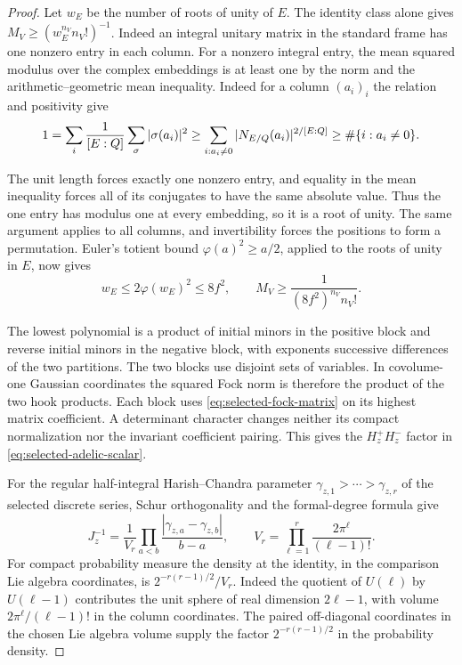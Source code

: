 \begin{proof}
Let \(w_E\) be the number of roots of unity of \(E\).
The identity class alone gives
\(M_V\ge(w_E^{n_V}n_V!)^{-1}\). Indeed an integral
unitary matrix in the standard frame has one
nonzero entry in each column. For a nonzero integral
entry, the mean squared modulus over the complex
embeddings is at least one by the norm and the
arithmetic--geometric mean inequality. Indeed for a column \((a_i)_i\) the relation and positivity give
\[
 1=\sum_i\frac1{[E:Q]}\sum_\sigma|\sigma(a_i)|^2
   \ge\sum_{i:a_i\ne0}|N_{E/Q}(a_i)|^{2/[E:Q]}
   \ge\#\{i:a_i\ne0\}.
\]

The unit length forces exactly one nonzero entry, and equality in
the mean inequality forces all of its conjugates to have the same
absolute value. Thus the one entry has
modulus one at every embedding, so it is a root
of unity. The same argument applies to all columns,
and invertibility forces the positions to form a
permutation. Euler's totient bound \(\varphi(a)^2\ge a/2\), applied to
the roots of unity in \(E\), now gives
\[
              w_E\le 2\varphi(w_E)^2\le 8f^2,\qquad
              M_V\ge\frac{1}{(8f^2)^{n_V}n_V!}.
\]
\label{cor:selected-lift-scalar-4}


The lowest polynomial is a product of initial minors
in the positive block and reverse initial minors in
the negative block, with exponents successive
differences of the two partitions. The two blocks
use disjoint sets of variables. In covolume-one
Gaussian coordinates the squared Fock norm is
therefore the product of the two hook products.
Each block uses \eqref{eq:selected-fock-matrix}
on its highest matrix coefficient. A determinant
character changes neither its compact normalization
nor the invariant coefficient pairing. This gives
the \(H_z^+H_z^-\) factor in
\eqref{eq:selected-adelic-scalar}.

For the regular half-integral Harish--Chandra
parameter \(\gamma_{z,1}>\cdots>\gamma_{z,r}\)
of the selected discrete series, Schur orthogonality
and the formal-degree formula give
\[
 J_z^{-1}=\frac{1}{V_r}
       \prod_{a<b}\frac{|\gamma_{z,a}-\gamma_{z,b}|}{b-a},
 \qquad
 V_r=\prod_{\ell=1}^r\frac{2\pi^\ell}{(\ell-1)!}.
\]
For compact probability measure the density at the
identity, in the comparison Lie algebra coordinates,
is \(2^{-r(r-1)/2}/V_r\). Indeed the quotient of
\(U(\ell)\) by \(U(\ell-1)\) contributes the unit
sphere of real dimension \(2\ell-1\), with volume
\(2\pi^\ell/(\ell-1)!\) in the column coordinates.
The paired off-diagonal coordinates in the chosen
Lie algebra volume supply the factor \(2^{-r(r-1)/2}\)
in the probability density.


\end{proof}
